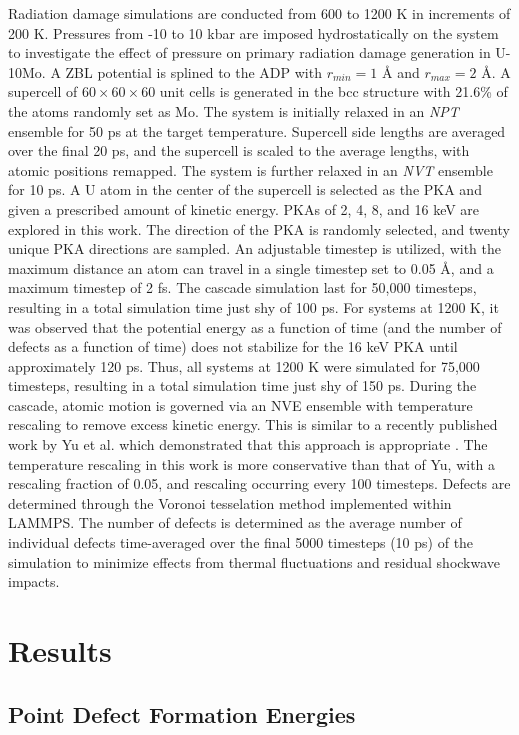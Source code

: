 \documentclass[review]{elsarticle}
\begin{document}
Radiation damage simulations are conducted from 600 to 1200 K in increments of 200 K. Pressures from -10 to 10 kbar are imposed hydrostatically on the system to investigate the effect of pressure on primary radiation damage generation in U-10Mo. A ZBL \cite{zbl} potential is splined to the ADP with $r_{min}=1$ {\AA} and $r_{max}=2$ {\AA}. A supercell of $60 \times 60 \times 60$ unit cells is generated in the bcc structure with 21.6\% of the atoms randomly set as Mo. The system is initially relaxed in an \textit{NPT} ensemble for 50 ps at the target temperature. Supercell side lengths are averaged over the final 20 ps, and the supercell is scaled to the average lengths, with atomic positions remapped. The system is further relaxed in an \textit{NVT} ensemble for 10 ps. A U atom in the center of the supercell is selected as the PKA and given a prescribed amount of kinetic energy. PKAs of 2, 4, 8, and 16 keV are explored in this work. The direction of the PKA is randomly selected, and twenty unique PKA directions are sampled. An adjustable timestep is utilized, with the maximum distance an atom can travel in a single timestep set to 0.05 {\AA}, and a maximum timestep of 2 fs. The cascade simulation last for 50,000 timesteps, resulting in a total simulation time just shy of 100 ps. For systems at 1200 K, it was observed that the potential energy as a function of time (and the number of defects as a function of time) does not stabilize for the 16 keV PKA until approximately 120 ps. Thus, all systems at 1200 K were simulated for 75,000 timesteps, resulting in a total simulation time just shy of 150 ps. During the cascade, atomic motion is governed via an NVE ensemble with temperature rescaling to remove excess kinetic energy. This is similar to a recently published work by Yu et al. which demonstrated that this approach is appropriate \cite{yu2024}. The temperature rescaling in this work is more conservative than that of Yu, with a rescaling fraction of 0.05, and rescaling occurring every 100 timesteps. Defects are determined through the Voronoi tesselation method implemented within LAMMPS. The number of defects is determined as the average number of individual defects time-averaged over the final 5000 timesteps (10 ps) of the simulation to minimize effects from thermal fluctuations and residual shockwave impacts. 

\section{Results}\label{sec3}
\subsection{Point Defect Formation Energies}
\end{document}
